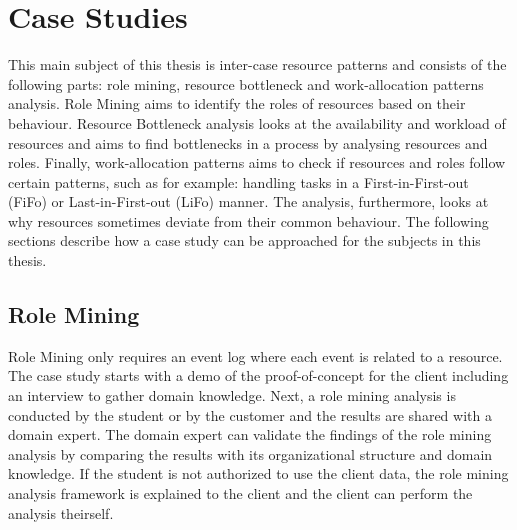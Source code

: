 \section*{Case Studies}

This main subject of this thesis is inter-case resource patterns and consists of the following parts: role mining, resource bottleneck and work-allocation patterns analysis. Role Mining aims to identify the roles of resources based on their behaviour. Resource Bottleneck analysis looks at the availability and workload of resources and aims to find bottlenecks in a process by analysing resources and roles. Finally, work-allocation patterns aims to check if resources and roles follow certain patterns, such as for example: handling tasks in a First-in-First-out (FiFo) or Last-in-First-out (LiFo) manner. The analysis, furthermore, looks at why resources sometimes deviate from their common behaviour. The following sections describe how a case study can be approached for the subjects in this thesis. 




\subsection*{Role Mining}
Role Mining only requires an event log where each event is related to a resource.  The case study starts with a demo of the proof-of-concept for the client including an interview to gather domain knowledge. Next, a role mining analysis is conducted by the student or by the customer and the results are shared with a domain expert. The domain expert can validate the findings of the role mining analysis by comparing the results with its organizational structure and domain knowledge. If the student is not authorized to use the client data, the role mining analysis framework is explained to the client and the client can perform the analysis theirself. 




